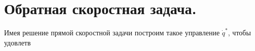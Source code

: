 \section{Обратная скоростная задача.}\label{invspd_sect}

Имея решение прямой скоростной задачи построим такое управление $\dot{q}^{*}$, чтобы удовлетв 
